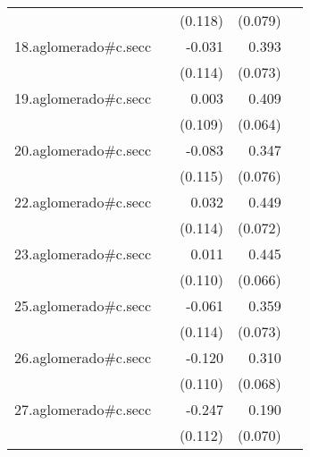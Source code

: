 {\begin{longtable}{l*{4}{D{.}{.}{-1}}}
            &                     &     (0.118)         &     (0.079)         &                     \\
\addlinespace
18.aglomerado#c.secc&                     &      -0.031         &       0.393\sym{***}&                     \\
            &                     &     (0.114)         &     (0.073)         &                     \\
\addlinespace
19.aglomerado#c.secc&                     &       0.003         &       0.409\sym{***}&                     \\
            &                     &     (0.109)         &     (0.064)         &                     \\
\addlinespace
20.aglomerado#c.secc&                     &      -0.083         &       0.347\sym{***}&                     \\
            &                     &     (0.115)         &     (0.076)         &                     \\
\addlinespace
22.aglomerado#c.secc&                     &       0.032         &       0.449\sym{***}&                     \\
            &                     &     (0.114)         &     (0.072)         &                     \\
\addlinespace
23.aglomerado#c.secc&                     &       0.011         &       0.445\sym{***}&                     \\
            &                     &     (0.110)         &     (0.066)         &                     \\
\addlinespace
25.aglomerado#c.secc&                     &      -0.061         &       0.359\sym{***}&                     \\
            &                     &     (0.114)         &     (0.073)         &                     \\
\addlinespace
26.aglomerado#c.secc&                     &      -0.120         &       0.310\sym{***}&                     \\
            &                     &     (0.110)         &     (0.068)         &                     \\
\addlinespace
27.aglomerado#c.secc&                     &      -0.247\sym{*}  &       0.190\sym{**} &                     \\
            &                     &     (0.112)         &     (0.070)         &                     \\

\end{longtable}}

